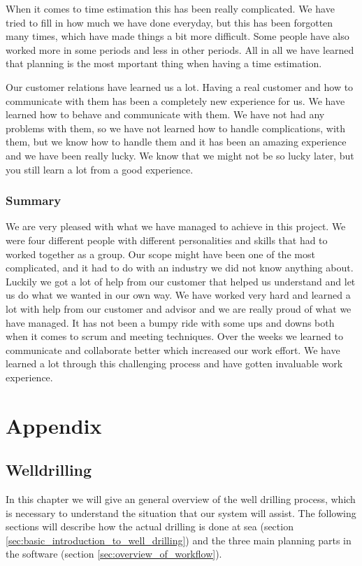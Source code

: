 \documentclass{report}
\begin{document}
When it comes to time estimation this has been really complicated. We have tried to fill in how much we have done everyday, but this has been forgotten many times, which have made things a bit more difficult. Some people have also worked more in some periods and less in other periods. All in all we have learned that planning is the most mportant thing when having a time estimation.

Our customer relations have learned us a lot. Having a real customer and how to communicate with them has been a completely new experience for us. We have learned how to behave and communicate with them. We have not had any problems with them, so we have not learned how to handle complications, with them, but we know how to handle them and it has been an amazing experience and we have been really lucky. We know that we might not be so lucky later, but you still learn a lot from a good experience. 


\newpage
\section{Summary} \label{sec:summary_eva}
We are very pleased with what we have managed to achieve in this project. We were four different people with different personalities and skills that had to worked together as a group. Our scope might have been one of the most complicated, and it had to do with an industry we did not know anything about. Luckily we got a lot of help from our customer that helped us understand and let us do what we wanted in our own way. We have worked very hard and learned a lot with help from our customer and advisor and we are really proud of what we have managed. It has not been a bumpy ride with some ups and downs both when it comes to scrum and meeting techniques. Over the weeks we learned to communicate and collaborate better which increased our work effort. We have learned a lot through this challenging process and have gotten invaluable work experience.











\part{Appendix}
\appendix
\chapter{Welldrilling} \label{cha:welldrilling}
In this chapter we will give an general overview of the well drilling process, which is necessary to understand the situation that our system will assist. The following sections will describe how the actual drilling is done at sea (section \ref{sec:basic_introduction_to_well_drilling}) and the three main planning parts in the software (section \ref{sec:overview_of_workflow}).
\end{document}
